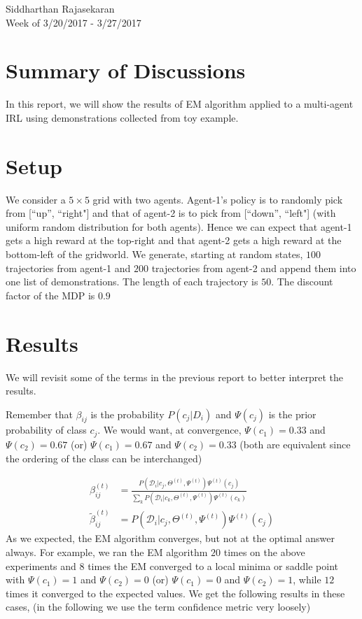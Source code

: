 \documentclass{article}[11pt]
\begin{document}
\begin{center}
Siddharthan Rajasekaran\\
Week of 3/20/2017 - 3/27/2017
\end{center}

\section{Summary of Discussions}
In this report, we will show the results of EM algorithm applied to a multi-agent IRL using demonstrations collected from toy example. 

\section{Setup}
We consider a $5 \times 5$ grid with two agents. Agent-1's policy is to randomly pick from [``up'', ``right"] and that of agent-2 is to pick from [``down'', ``left"] (with uniform random distribution for both agents). Hence we can expect that agent-1 gets a high reward at the top-right and that agent-2 gets a high reward at the bottom-left of the gridworld. We generate, starting at random states, $100$ trajectories from agent-1 and $200$ trajectories from agent-2 and append them into one list of demonstrations. The length of each trajectory is $50$. The discount factor of the MDP is $0.9$

\section{Results}
We will revisit some of the terms in the previous report to better interpret the results. 

Remember that $\beta_{ij}$ is the probability $P(c_j|D_i)$ and $\Psi(c_j)$ is the prior probability of class $c_j$. We would want, at convergence, $\Psi(c_1) = 0.33$ and $\Psi(c_2) = 0.67$ (or) $\Psi(c_1) = 0.67$ and $\Psi(c_2) = 0.33$ (both are equivalent since the ordering of the class can be interchanged)

\begin{align}
\label{def_beta}
\beta_{ij}^{(t)} &= \frac{P(\mathcal{D}_i| c_j,\Theta^{(t)},\Psi^{(t)})\Psi^{(t)}(c_{j})}{\sum_k P(\mathcal{D}_i| c_k,\Theta^{(t)},\Psi^{(t)})\Psi^{(t)}(c_{k})}\\
\label{def_unn}
\tilde{\beta}_{ij}^{(t)} &= P(\mathcal{D}_i| c_j,\Theta^{(t)},\Psi^{(t)})\Psi^{(t)}(c_{j})
\end{align} As we expected, the EM algorithm converges, but not at the optimal answer always. For example, we ran the EM algorithm $20$ times on the above experiments and $8$ times the EM converged to a local minima or saddle point with $\Psi(c_1) = 1$ and $\Psi(c_2) = 0$ (or) $\Psi(c_1) = 0$ and $\Psi(c_2) = 1$, while $12$ times it converged to the expected values. We get the following results in these cases, (in the following we use the term confidence metric very loosely)
\end{document}
